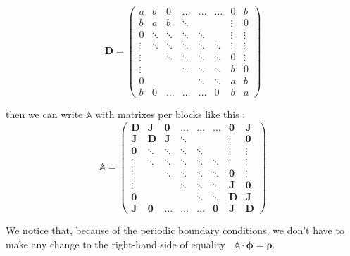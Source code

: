 \documentclass[10pt]{article}
\begin{document}
$$
\mathbf{D} = \left(
\begin{array}{cccccccccc}
  a   &  b  &  0  &  \dots  &  \dots  &  \dots  &  0       &  b
      \\
b    &  a  &  b
  &  \ddots   &    &    &  \vdots  &   0    \\
 0   &  \ddots  &  \ddots  &  \ddots  &  \ddots  &    &  \vdots  & \vdots \\
  \vdots  &  \ddots  &  \ddots  &  \ddots  &  \ddots  &  \ddots  &  \vdots  & \vdots \\
  \vdots  &    &  \ddots  &  \ddots  &  \ddots  &  \ddots  &  0  & \vdots \\
  \vdots  &    &    &  \ddots  &  \ddots  &  \ddots  &  b  & 0 \\
  0  &    &    &    &  \ddots  &  \ddots  &  a  &  b    \\
  b  &  0  &  \dots  &  \dots  &  \dots  &  0  &  b       &  a
  
\end{array}
\right) 
$$ 

then we can write $\mathbb{A}$ with matrixes per blocks like this :
$$\mathbb{A} = \left(
\begin{array}{cccccccccc}
  \mathbf{D}   &  \mathbf{J}  &  \mathbf{0}  &  \dots  &  \dots  &  \dots  &  \mathbf{0}       &  \mathbf{J}
      \\
\mathbf{J}    &  \mathbf{D}  &  \mathbf{J}
  &  \ddots   &    &    &  \vdots  &   \mathbf{0}    \\
 \mathbf{0}   &  \ddots  &  \ddots  &  \ddots  &  \ddots  &    &  \vdots  & \vdots \\
  \vdots  &  \ddots  &  \ddots  &  \ddots  &  \ddots  &  \ddots  &  \vdots  & \vdots \\
  \vdots  &    &  \ddots  &  \ddots  &  \ddots  &  \ddots  &  \mathbf{0}  & \vdots \\
  \vdots  &    &    &  \ddots  &  \ddots  &  \ddots  &  \mathbf{J}  & \mathbf{0} \\
  \mathbf{0}  &    &    &    &  \ddots  &  \ddots  &  \mathbf{D}  &  \mathbf{J}    \\
  \mathbf{J}  &  \mathbf{0}  &  \dots  &  \dots  &  \dots  &  \mathbf{0}  &  \mathbf{J}       &  \mathbf{D}
\end{array}
\right) $$


We notice that, because of the periodic boundary conditions, we don't have to make any change to the right-hand side of equality $\;\; \mathbb{A} \cdot \bm{\phi} = \bm{\rho}$.\\
\end{document}
